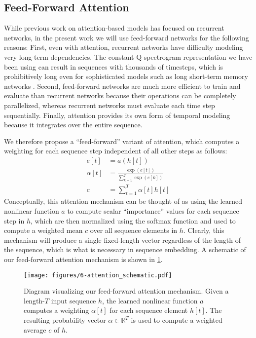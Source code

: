 \subsection{Feed-Forward Attention}
\label{sec:ffattention}

While previous work on attention-based models has focused on recurrent networks, in the present work we will use feed-forward networks for the following reasons:
First, even with attention, recurrent networks have difficulty modeling very long-term dependencies.
The constant-Q spectrogram representation we have been using can result in sequences with thousands of timesteps, which is prohibitively long even for sophisticated models such as long short-term memory networks \cite{hochreiter1997long}.
Second, feed-forward networks are much more efficient to train and evaluate than recurrent networks because their operations can be completely parallelized, whereas recurrent networks must evaluate each time step sequentially.
Finally, attention provides its own form of temporal modeling because it integrates over the entire sequence.

We therefore propose a ``feed-forward'' variant of attention, which computes a weighting for each sequence step independent of all other steps as follows:
\begin{align}
e[t] &= a(h[t])\\
\alpha[t] &= \frac{\exp(e[t])}{\sum_{k = 1}^T \exp(e[k])}\\
\label{eq:ffattention}
c &= \sum_{t = 1}^T \alpha[t] h[t]
\end{align}
Conceptually, this attention mechanism can be thought of as using the learned nonlinear function $a$ to compute scalar ``importance'' values for each sequence step in $h$, which are then normalized using the softmax function and used to compute a weighted mean $c$ over all sequence elements in $h$.
Clearly, this mechanism will produce a single fixed-length vector regardless of the length of the sequence, which is what is necessary in sequence embedding.
A schematic of our feed-forward attention mechanism is shown in \cref{fig:attention_schematic}.

\begin{figure}
  \texttt{[image: figures/6-attention\_schematic.pdf]}
  \caption[Feed-forward attention mechanism]{Diagram visualizing our feed-forward attention mechanism.
Given a length-$T$ input sequence $h$, the learned nonlinear function $a$ computes a weighting $\alpha[t]$ for each sequence element $h[t]$.
The resulting probability vector $\alpha \in \mathbb{R}^T$ is used to compute a weighted average $c$ of $h$.}
  \label{fig:attention_schematic}
\end{figure}

